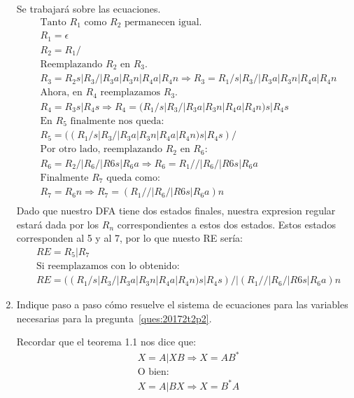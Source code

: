 \documentclass[spanish, fleqn]{article}
\begin{document}
\begin{enumerate}
    Se trabajará sobre las ecuaciones.
    \begin{align*}
    &\text{Tanto $R_1$ como $R_2$ permanecen igual.}\\
    &R_{1}=\epsilon \\
    &R_{2}=R_{1}/\\
    &\text{Reemplazando $R_2$ en $R_3$.}\\
    &R_{3}=R_{2}s|R_{3}/|R_{3}a|R_{3}n|R_{4}a|R_{4}n \Rightarrow  R_{3}=R_{1}/s|R_{3}/|R_{3}a|R_{3}n|R_{4}a|R_{4}n\\
    &\text{Ahora, en $R_4$ reemplazamos $R_3$.}\\
    &R_4=R_{3}s|R_{4}s \Rightarrow R_4=(R_{1}/s|R_{3}/|R_{3}a|R_{3}n|R_{4}a|R_{4}n)s|R_4s\\
    &\text{En $R_5$ finalmente nos queda:}\\
    &R_{5}=((R_{1}/s|R_{3}/|R_{3}a|R_{3}n|R_{4}a|R_{4}n)s|R_4s)/\\
    &\text{Por otro lado, reemplazando $R_2$ en $R_6$:}\\
    &R_6=R_{2}/|R_{6}/|R{6}s|R_{6}a \Rightarrow R_6=R_{1}//|R_{6}/|R{6}s|R_{6}a\\
    &\text{Finalmente $R_7$ queda como:}\\
    &R_7=R_6n \Rightarrow R_7=(R_{1}//|R_{6}/|R{6}s|R_{6}a)n\\
    \end{align*}    
    Dado que nuestro DFA tiene dos estados finales, nuestra expresion regular estará dada por los $R_n$ correspondientes a estos
    dos estados. Estos estados corresponden al 5 y al 7, por lo que nuesto RE sería:
    \begin{align*}
	&RE=R_5 | R_7\\
    &\text{Si reemplazamos con lo obtenido:}\\
    &RE=((R_{1}/s|R_{3}/|R_{3}a|R_{3}n|R_{4}a|R_{4}n)s|R_4s)/|(R_{1}//|R_{6}/|R{6}s|R_{6}a)n
    \end{align*}
        
  \item %
    Indique paso a paso cómo resuelve el sistema de ecuaciones
    para las variables necesarias para la pregunta~\ref{ques:20172t2p2}.
	
	Recordar que el teorema 1.1 nos dice que:
	\begin{align*}
	&X = A | XB \Rightarrow X = AB^*\\
	&\text{O bien:}\\
	&X = A | BX \Rightarrow X = B^*A
	\end{align*}	    
    

\end{enumerate}
\end{document}
